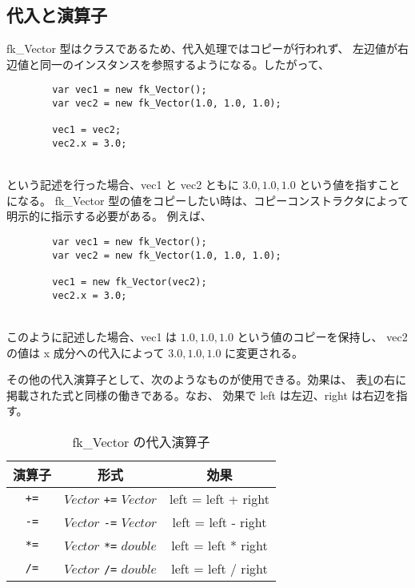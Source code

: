 \subsection{代入と演算子}
fk\_Vector 型はクラスであるため、代入処理ではコピーが行われず、
左辺値が右辺値と同一のインスタンスを参照するようになる。したがって、
\\
\begin{screen}
\begin{verbatim}
        var vec1 = new fk_Vector();
        var vec2 = new fk_Vector(1.0, 1.0, 1.0);

        vec1 = vec2;
        vec2.x = 3.0;
\end{verbatim}
\end{screen}
~ \\
という記述を行った場合、vec1 と vec2 ともに \(3.0, 1.0, 1.0\) という値を指すことになる。
fk\_Vector 型の値をコピーしたい時は、コピーコンストラクタによって明示的に指示する必要がある。
例えば、
\\
\begin{screen}
\begin{verbatim}
        var vec1 = new fk_Vector();
        var vec2 = new fk_Vector(1.0, 1.0, 1.0);

        vec1 = new fk_Vector(vec2);
        vec2.x = 3.0;
\end{verbatim}
\end{screen}
~ \\
このように記述した場合、vec1 は \(1.0, 1.0, 1.0\) という値のコピーを保持し、
vec2 の値は x 成分への代入によって \(3.0, 1.0, 1.0\) に変更される。

その他の代入演算子として、次のようなものが使用できる。効果は、
表\ref{tbl:fkVec2}の右に掲載された式と同様の働きである。なお、
効果で left は左辺、right は右辺を指す。
\begin{table}[H]
\caption{fk\_Vector の代入演算子}
\label{tbl:fkVec2}
\begin{center}
\begin{tabular}{|c|c|c|}
\hline
演算子 & 形式 & 効果 \\ \hline \hline
\verb-+=- & \(Vector\) \verb-+=- \(Vector\) &
	left = left + right \\ \hline
\verb+-=+ & \(Vector\) \verb+-=+ \(Vector\) &
	left = left - right \\ \hline
\verb+*=+ & \(Vector\) \verb+*=+ \(double\) &
	left = left * right \\ \hline
\verb+/=+ & \(Vector\) \verb+/=+ \(double\) &
	left = left / right \\ \hline
\end{tabular}
\end{center}
\end{table}

